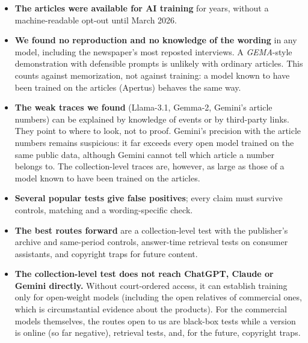 \documentclass[10pt,a4paper]{article}
\begin{document}
\begin{itemize}
\item \textbf{The articles were available for AI training} for years, without a machine-readable opt-out until March
2026.
\item \textbf{We found no reproduction and no knowledge of the wording} in any model, including the newspaper's most
reposted interviews. A \emph{GEMA}-style demonstration with defensible prompts is unlikely with ordinary articles.
This counts against memorization, not against training: a model known to have been trained on the articles
(Apertus) behaves the same way.
\item \textbf{The weak traces we found} (Llama-3.1, Gemma-2, Gemini's article numbers) can be explained by knowledge
of events or by third-party links. They point to where to look, not to proof. Gemini's precision with the article
numbers remains suspicious: it far exceeds every open model trained on the same public data, although Gemini cannot
tell which article a number belongs to. The collection-level traces are, however,
as large as those of a model known to have been trained on the articles.
\item \textbf{Several popular tests give false positives}; every claim must survive controls, matching and a
wording-specific check.
\item \textbf{The best routes forward} are a collection-level test with the publisher's archive and same-period
controls, answer-time retrieval tests on consumer assistants, and copyright traps for future content.
\item \textbf{The collection-level test does not reach ChatGPT, Claude or Gemini directly.} Without court-ordered
access, it can establish training only for open-weight models (including the open relatives of commercial ones,
which is circumstantial evidence about the products). For the commercial models themselves, the routes open to us are
black-box tests while a version is online (so far negative), retrieval tests, and, for the future, copyright traps.
\end{itemize}
\end{document}
